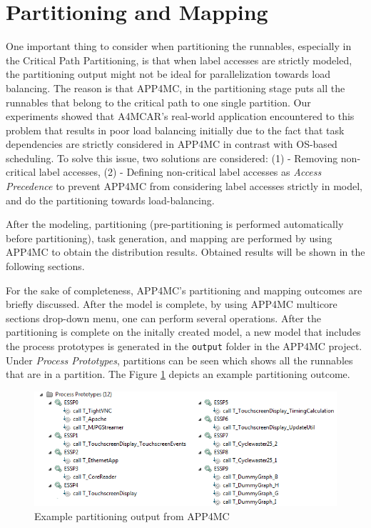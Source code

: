 \section{Partitioning and Mapping}

One important thing to consider when partitioning the runnables, especially in the Critical Path Partitioning, is that when label accesses are strictly modeled, the partitioning output might not be ideal for parallelization towards load balancing. The reason is that APP4MC, in the partitioning stage puts all the runnables that belong to the critical path to one single partition. Our experiments showed that A4MCAR's real-world application encountered to this problem that results in poor load balancing initially due to the fact that task dependencies are strictly considered in APP4MC in contrast with OS-based scheduling. To solve this issue, two solutions are considered: (1) - Removing non-critical label accesses, (2) - Defining non-critical label accesses as \textit{Access Precedence} to prevent APP4MC from considering label accesses strictly in model, and do the partitioning towards load-balancing.

After the modeling, partitioning (pre-partitioning is performed automatically before partitioning), task generation, and mapping are performed by using APP4MC to obtain the distribution results. Obtained results will be shown in the following sections.

For the sake of completeness, APP4MC's partitioning and mapping outcomes are briefly discussed. After the model is complete, by using APP4MC multicore sections drop-down menu, one can perform several operations. After the partitioning is complete on the initally created model, a new model that includes the process prototypes is generated in the \texttt{output} folder in the APP4MC project. Under \textit{Process Prototypes}, partitions can be seen which shows all the runnables that are in a partition. The Figure \ref{fig:partitions} depicts an example partitioning outcome.

\begin{figure}[!ht]
	\centering
	\captionsetup{justification=centering}
	\includegraphics[width=\textwidth]{content/images/partitions.png}
	\caption{Example partitioning output from APP4MC}
	\label{fig:partitions}
\end{figure}

